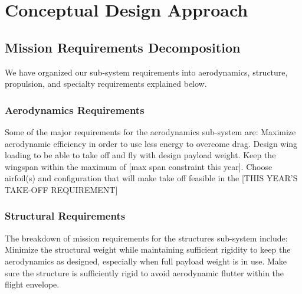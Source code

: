\documentclass[proposal]{byu-aero}
\begin{document}

\section{Conceptual Design Approach} %
\label{sec:ConceptualDesign}



\subsection{Mission Requirements Decomposition}
\label{ssec:MissionReqs}

We have organized our sub-system requirements into aerodynamics, structure, propulsion, and specialty requirements explained below.

\subsubsection{Aerodynamics Requirements}
\label{sssec:AerodynamicReqs}

Some of the major requirements for the aerodynamics sub-system are: Maximize aerodynamic efficiency in order to use less energy to overcome drag.  Design wing loading to be able to take off and fly with design payload weight.  Keep the wingspan within the maximum of {\color{BYUred}[max span constraint this year]}.  Choose airfoil(s) and configuration that will make take off feasible in the {\color{BYUred}[THIS YEAR'S TAKE-OFF REQUIREMENT]}

\subsubsection{Structural Requirements}
\label{sssec:StructuralReqs}

The breakdown of mission requirements for the structures sub-system include: Minimize the structural weight while maintaining sufficient rigidity to keep the aerodynamics as designed, especially when full payload weight is in use.  Make sure the structure is sufficiently rigid to avoid aerodynamic flutter within the flight envelope.
\end{document}
